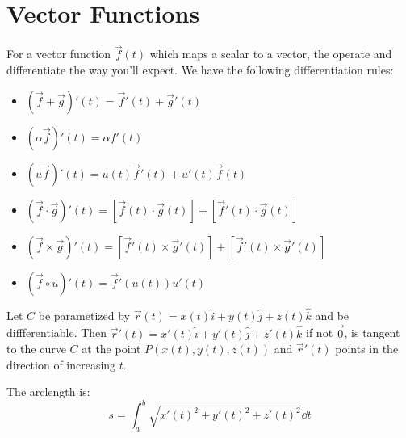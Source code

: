 \documentclass{article}
\begin{document}
    \section{Vector Functions}
    For a vector function $\vec{f}(t)$ which maps a scalar to a vector, the operate and differentiate the way you'll expect. We have the following differentiation rules:
    \begin{itemize}
        \item $(\vec{f}+\vec{g})'(t) = \vec{f}'(t) + \vec{g}'(t)$
        \item $(\alpha\vec{f})'(t) = \alpha f'(t)$
        \item $(u\vec{f})'(t) = u(t)\vec{f}'(t) + u'(t)\vec{f}(t)$
        \item $(\vec{f}\cdot \vec{g})'(t) = \left[\vec{f}(t) \cdot \vec{g}(t)\right] + \left[\vec{f}'(t) \cdot \vec{g}(t)\right]$
        \item $(\vec{f} \times \vec{g})'(t) = \left[\vec{f}'(t) \times \vec{g}'(t)\right] + \left[\vec{f}'(t) \times \vec{g}'(t)\right]$
        \item $(\vec{f}\circ u)'(t) = \vec{f}'(u(t))u'(t)$
    \end{itemize}
    \begin{definition}
        Let $C$ be parametized by $\vec{r}(t) = x(t) \hat{i} + y(t)\hat{j} +z(t)\hat{k}$ and be diffferentiable. Then $\vec{r}'(t)= x'(t)\hat{i}+y'(t)\hat{j}+z'(t)\hat{k}$ if not $\vec{0}$, is tangent to the curve $C$ at the point $P(x(t), y(t), z(t))$ and $\vec{r}'(t)$ points in the direction of increasing $t$.
    \end{definition}
    The arclength is:
        \begin{equation}
            s = \int_a^b\sqrt{x'(t)^2+y'(t)^2+z'(t)^2}\dd{t}
        \end{equation}
\end{document}
